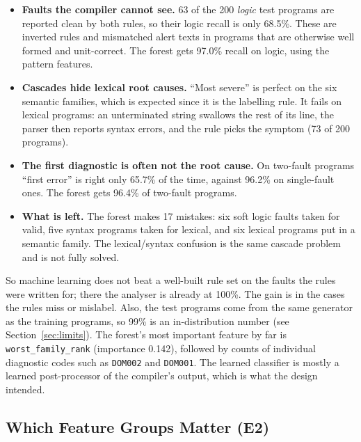 \documentclass[12pt,a4paper]{article}
\newcommand{\code}[1]{\texttt{#1}}
\newcommand{\RuleFirstDouble}{65.7}
\newcommand{\RFDouble}{96.4}
\newcommand{\RuleLogicRecall}{68.5}
\newcommand{\RFLogicRecall}{97.0}
\begin{document}
\begin{itemize}
    \item \textbf{Faults the compiler cannot see.} 63 of the 200 \emph{logic} test programs are reported clean by both
    rules, so their logic recall is only \RuleLogicRecall\%. These are inverted rules and mismatched alert texts in
    programs that are otherwise well formed and unit-correct. The forest gets \RFLogicRecall\% recall on logic, using the
    pattern features.
    \item \textbf{Cascades hide lexical root causes.} ``Most severe'' is perfect on the six semantic families, which is
    expected since it is the labelling rule. It fails on lexical programs: an unterminated string swallows the rest of its
    line, the parser then reports syntax errors, and the rule picks the symptom (73 of 200 programs).
    \item \textbf{The first diagnostic is often not the root cause.} On two-fault programs ``first error'' is right only
    \RuleFirstDouble\% of the time, against 96.2\% on single-fault ones. The forest gets \RFDouble\% of two-fault programs.
    \item \textbf{What is left.} The forest makes 17 mistakes: six soft logic faults taken for valid, five syntax
    programs taken for lexical, and six lexical programs put in a semantic family. The lexical/syntax confusion is the
    same cascade problem and is not fully solved.
\end{itemize}

So machine learning does not beat a well-built rule set on the faults the rules were written for; there the analyser
is already at 100\%. The gain is in the cases the rules miss or mislabel. Also, the test programs come from the same
generator as the training programs, so 99\% is an in-distribution number (see Section~\ref{sec:limits}). The forest's most important
feature by far is \code{worst\_family\_rank} (importance 0.142), followed by counts of individual diagnostic codes such as
\code{DOM002} and \code{DOM001}. The learned classifier is mostly a learned post-processor of the compiler's output,
which is what the design intended.

\subsection{Which Feature Groups Matter (E2)}
\end{document}
